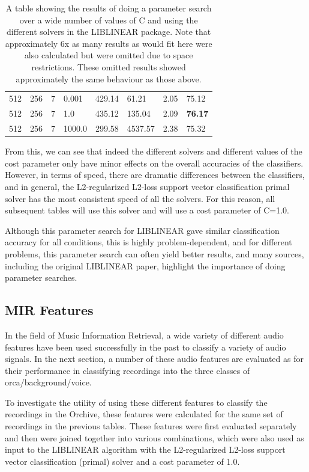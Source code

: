 \documentclass[12pt,oneside]{book}
\begin{document}
\begin{table}
\begin{tabular}{|l|l|l|l|l|l|l|l|}
\hline
 512 & 256     &   7 & 0.001   &  429.14  &     61.21  &  2.05  &  75.12  \\
 512 & 256     &   7 & 1.0     &  435.12  &    135.04  &  2.09  &  \textbf{76.17}  \\
 512 & 256     &   7 & 1000.0  &  299.58  &   4537.57  &  2.38  &  75.32  \\
\hline
\end{tabular}
\caption{A table showing the results of doing a
  parameter search over a wide number of values of C and using the
  different solvers in the LIBLINEAR package.  Note that
  approximately 6x as many results as would fit here were also
  calculated but were omitted due to space restrictions.  These
  omitted results showed approximately the same behaviour as those
  above.}
\label{table:obv-liblinearParams}
\end{table}

From this, we can see that indeed the different solvers and different
values of the cost parameter only have minor effects on the overall
accuracies of the classifiers.  However, in terms of speed, there are
dramatic differences between the classifiers, and in general, the
L2-regularized L2-loss support vector classification primal solver has
the most consistent speed of all the solvers.  For this reason, all
subsequent tables will use this solver and will use a cost parameter
of C=1.0.

Although this parameter search for LIBLINEAR
\cite{rongen2008liblinear} gave similar classification accuracy for
all conditions, this is highly problem-dependent, and for different
problems, this parameter search can often yield better results, and
many sources, including the original LIBLINEAR paper, highlight the
importance of doing parameter searches.

%
%
\subsection{MIR Features}

In the field of Music Information Retrieval, a wide variety of
different audio features have been used successfully in the past to
classify a variety of audio signals.  In the next section, a number of
these audio features are evaluated as for their performance in
classifying recordings into the three classes of
orca/background/voice.  

To investigate the utility of using these different features to
classify the recordings in the Orchive, these features were calculated
for the same set of recordings in the previous tables.  These features
were first evaluated separately and then were joined together into
various combinations, which were also used as input to the LIBLINEAR
algorithm with the L2-regularized L2-loss support vector
classification (primal) solver and a cost parameter of 1.0.
\end{document}
